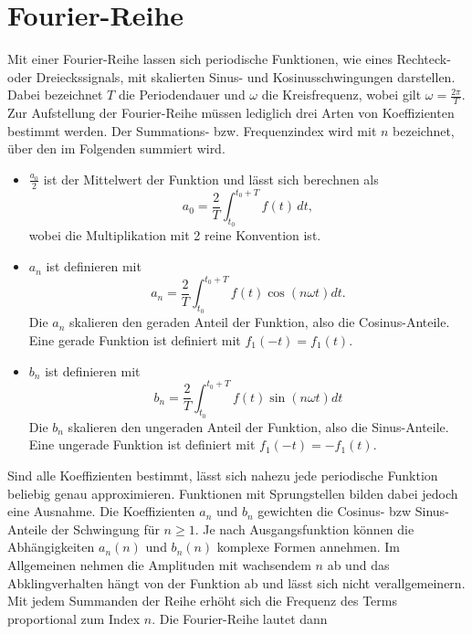 %
%
%
%

\section{Fourier-Reihe\label{fourier:section:GrundlagenFourierAnalyse}}


Mit einer Fourier-Reihe lassen sich periodische Funktionen, wie eines Rechteck- oder Dreieckssignals, mit skalierten Sinus- und Kosinusschwingungen darstellen.  
Dabei bezeichnet $T$ die Periodendauer und $\omega$ die Kreisfrequenz, wobei gilt $\omega = \frac{2\pi}{T}$.
Zur Aufstellung der Fourier-Reihe müssen lediglich drei Arten von Koeffizienten bestimmt werden. 
Der Summations- bzw. Frequenzindex wird mit $n$ bezeichnet, über den im Folgenden summiert wird.




\begin{itemize}
	
	\item $\frac{a_0}{2}$ ist der Mittelwert der Funktion und lässt sich berechnen als
	\begin{equation}
		a_0 = \frac{2}{T} \int_{t_0}^{t_0 + T} f(t) \, dt,
	\end{equation}
	wobei die Multiplikation mit 2 reine Konvention ist.
	
	\item $a_n$ ist definieren mit 
	\begin{equation}
		a_n = \frac{2}{T} \int_{t_0}^{t_0 + T} f(t) \cos\left(n\omega t\right) dt.
	\end{equation}
	Die $a_n$ skalieren den geraden Anteil der Funktion, also die Cosinus-Anteile. 
	Eine gerade Funktion ist definiert mit $f_1(-t) = f_1(t)$. 
	
	
	\item $b_n$ ist definieren mit 
	\begin{equation}
		b_n = \frac{2}{T} \int_{t_0}^{t_0 + T} f(t) \sin\left(n\omega t\right) dt
	\end{equation}
	Die $b_n$ skalieren den ungeraden Anteil der Funktion, also die Sinus-Anteile. 
	Eine ungerade Funktion ist definiert mit $f_1(-t) = -f_1(t)$. 
	
\end{itemize}


Sind alle Koeffizienten bestimmt, lässt sich nahezu jede periodische Funktion beliebig genau approximieren.
Funktionen mit Sprungstellen bilden dabei jedoch eine Ausnahme. 
Die Koeffizienten $a_n$ und $b_n$ gewichten die Cosinus- bzw Sinus-Anteile der Schwingung für $n \ge 1$.
Je nach Ausgangsfunktion können die Abhängigkeiten $a_n(n)$ und $b_n(n)$ komplexe Formen annehmen.
Im Allgemeinen nehmen die Amplituden mit wachsendem $n$ ab und das Abklingverhalten hängt von der Funktion ab und lässt sich nicht verallgemeinern.
Mit jedem Summanden der Reihe erhöht sich die Frequenz des Terms proportional zum Index $n$.
Die Fourier-Reihe lautet dann 

